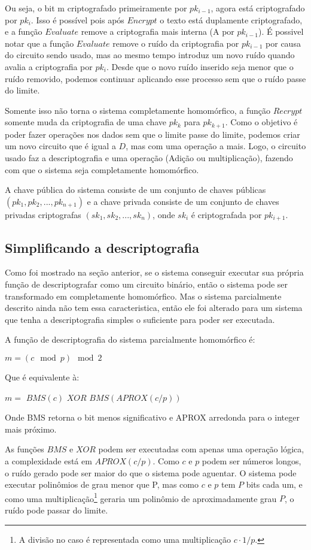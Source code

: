 	Ou seja, o bit m criptografado primeiramente por $pk_{i-1}$, agora está criptografado por $pk_{i}$.
	Isso é possível pois após $Encrypt$ o texto está duplamente criptografado, e a função $Evaluate$ remove a criptografia mais interna (A por $pk_{i-1}$).
	É possivel notar que a função $Evaluate$ remove o ruído da criptografia por $pk_{i-1}$ por causa do circuito sendo usado, mas ao mesmo tempo introduz um novo ruído quando avalia a criptografia por $pk_i$.
	Desde que o novo ruído inserido seja menor que o ruído removido, podemos continuar aplicando esse processo sem que o ruído passe do limite.
  
	Somente isso não torna o sistema completamente homomórfico, a função $Recrypt$ somente muda da criptografia de uma chave $pk_k$ para $pk_{k+1}$.
	Como o objetivo é poder fazer operações nos dados sem que o limite passe do limite, podemos criar um novo circuito que é igual a $D$, mas com uma operação a mais.
	Logo, o circuito usado faz a descriptografia e uma operação (Adição ou multiplicação), fazendo com que o sistema seja completamente homomórfico.
  
	A chave pública do sistema consiste de um conjunto de chaves públicas $(pk_1, pk_2, ..., pk_{n+1})$ e a chave privada consiste de um conjunto de chaves privadas criptografas $(sk_1, sk_2, ..., sk_n)$, onde $sk_i$ é criptografada por $pk_{i+1}$.

	\subsection{Simplificando a descriptografia}
	Como foi mostrado na seção anterior, se o sistema conseguir executar sua própria função de descriptografar como um circuito binário, então o sistema pode ser transformado em completamente homomórfico.
  	Mas o sistema parcialmente descrito ainda não tem essa caracteristica, então ele foi alterado para um sistema que tenha a descriptografia simples o suficiente para poder ser executada.
  	
  	A função de descriptografia do sistema parcialmente homomórfico é:
  	\begin{center} $m = (c \mod p) \mod 2$ \end{center}
  	Que é equivalente à:
  	\begin{center} $m =$ $BMS(c)$ $XOR$ $BMS(APROX(c/p))$ \end{center}
  	Onde BMS retorna o bit menos significativo e APROX arredonda para o integer mais próximo.
  	
  	As funções $BMS$ e $XOR$ podem ser executadas com apenas uma operação lógica, a complexidade está em $APROX(c/p)$. Como $c$ e $p$ podem ser números longos, o ruído gerado pode ser maior do que o sistema pode aguentar. O sistema pode executar polinômios de grau menor que P, mas como $c$ e $p$ tem $P$ bits cada um, e como uma multiplicação\footnote{A divisão no caso é representada como uma multiplicação $c \cdot 1/p$.} geraria um polinômio de aproximadamente grau $P$, o ruído pode passar do limite.
  	
